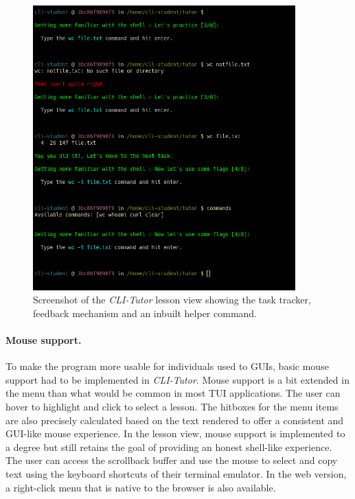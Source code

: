 \begin{figure}[htbp]
	\centering
	\includegraphics[width=0.9\textwidth]{img/lessonview}
	\caption{Screenshot of the \textit{CLI-Tutor} lesson view showing the task tracker, feedback mechanism and an inbuilt helper command.}
	\label{fig:lessonview}
\end{figure}


\paragraph{Mouse support.} To make the program more usable for
individuals used to GUIs, basic mouse support had to be implemented in
\textit{CLI-Tutor}. Mouse support is a bit extended in the menu than what would
be common in most TUI applications. The user can hover to highlight and click
to select a lesson. The hitboxes for the menu items are also precisely
calculated based on the text rendered to offer a consistent and GUI-like mouse
experience. In the lesson view, mouse support is implemented to a degree but
still retains the goal of providing an honest shell-like experience. The user
can access the scrollback buffer and use the mouse to select and copy text
using the keyboard shortcuts of their terminal emulator. In the web version, a
right-click menu that is native to the browser is also available.

